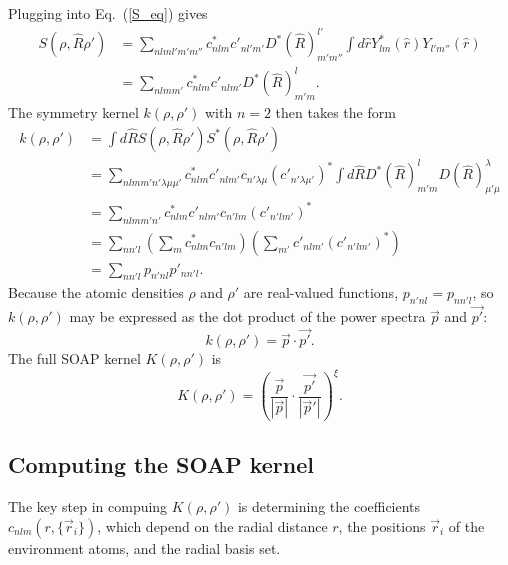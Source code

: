 \documentclass[%
preprint,
amsmath,amssymb,
aps,
]{revtex4-1}
\begin{document}
Plugging into Eq.\ (\ref{S_eq}) gives
\begin{equation}
    \begin{split}
S(\rho, \hat{R} \rho') &= \sum_{n l m l' m' m''} c^*_{n l m} c'_{n l' m'} D^*(\hat{R})^{l'}_{m' m''} \int d\hat{r} Y^*_{l m }(\hat{r}) Y_{l' m''}(\hat{r}) \\
&= \sum_{n l m m'} c^*_{n l m} c'_{n l m'} D^*(\hat{R})^l_{m' m}.
    \end{split}
\end{equation}
The symmetry kernel $k(\rho, \rho')$ with $n = 2$ then takes the form
\begin{equation}
    \begin{split}
k(\rho, \rho') &= \int d\hat{R} S(\rho, \hat{R}\rho') S^*(\rho, \hat{R} \rho') \\
&= \sum_{n l m m' n' \lambda \mu \mu'} c^*_{n l m} c'_{n l m'} c_{n' \lambda \mu} (c'_{n' \lambda \mu'})^* \int d\hat{R} D^*(\hat{R})^l_{m' m} D(\hat{R})^\lambda_{\mu' \mu} \\
&= \sum_{n l m m' n'} c^*_{n l m} c'_{n l m'} c_{n' l m} (c'_{n' l m'})^* \\
&= \sum_{n n' l} \left(\sum_{m} c^*_{n l m} c_{n' l m} \right) \left(\sum_{m'} c'_{n l m'} (c'_{n' l m'})^* \right) \\
&= \sum_{n n' l} p_{n' n l} p'_{n n' l}.
    \end{split}
\end{equation}
Because the atomic densities $\rho$ and $\rho'$ are real-valued functions, $p_{n' n l} = p_{n n' l}$, so $k(\rho, \rho')$ may be expressed as the dot product of the power spectra $\vec{p}$ and $\vec{p'}$:
\begin{equation}
k(\rho, \rho') = \vec{p} \cdot \vec{p'}.
\end{equation}
The full SOAP kernel $K(\rho, \rho')$ is
\begin{equation}
K(\rho, \rho') = \left( \frac{\vec{p}}{|\vec{p}|} \cdot \frac{\vec{p'}}{|\vec{p}'|} \right)^{\xi}.
\end{equation}

\subsection{Computing the SOAP kernel}
The key step in compuing $K(\rho, \rho')$ is determining the coefficients $c_{n l m}(r, \{\vec{r}_i\})$, which depend on the radial distance $r$, the positions $\vec{r}_i$ of the environment atoms, and the radial basis set.

\end{document}
